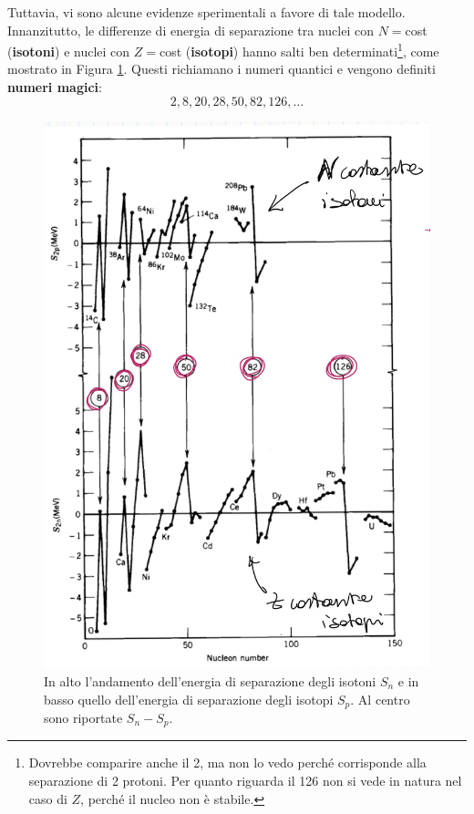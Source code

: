 \newline
Tuttavia, vi sono alcune evidenze sperimentali a favore di tale modello. Innanzitutto, le differenze di energia di separazione tra nuclei con $N=$cost (\textbf{isotoni}) e nuclei con $Z=$cost (\textbf{isotopi}) hanno salti ben determinati\footnote{Dovrebbe comparire anche il 2, ma non lo vedo perché corrisponde alla separazione di 2 protoni. Per quanto riguarda il 126 non si vede in natura nel caso di $Z$, perché il nucleo non è stabile.}, come mostrato in Figura \ref{diffeng}. Questi richiamano i numeri quantici e vengono definiti \textbf{numeri magici}:
$$2,8,20,28,50,82,126,\dots$$
\begin{figure}[!h]
    \centering
    \includegraphics[scale=0.3]{Immagini/mag-num.png}
    \caption{In alto l'andamento dell'energia di separazione degli isotoni $S_n$ e in basso quello dell'energia di separazione degli isotopi $S_p$. Al centro sono riportate $S_n-S_p$.}
    \label{diffeng}
\end{figure}

